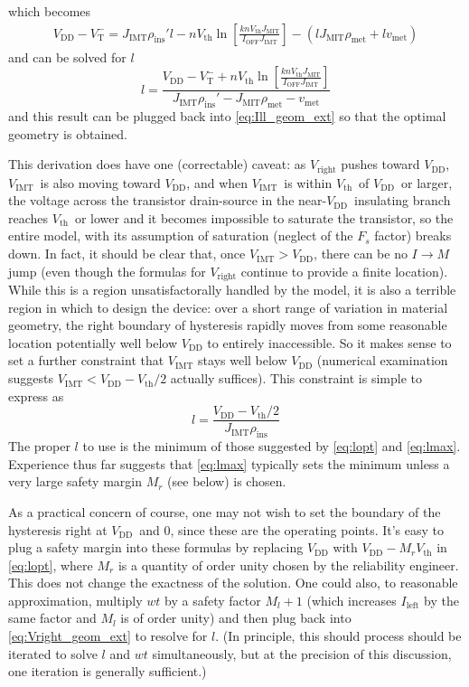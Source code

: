 \documentclass[letterpaper]{article}
\newcommand{\VTm}{\ensuremath{V_\mathrm{T}^-}}
\newcommand{\VDD}{\ensuremath{V_\mathrm{DD}}}
\newcommand{\Vth}{\ensuremath{V_\mathrm{th}}}
\newcommand{\VIMT}{\ensuremath{V_\mathrm{IMT}}}
\newcommand{\vmet}{\ensuremath{v_\mathrm{met}}}
\newcommand{\IOFF }{\ensuremath{I_\mathrm{OFF}}}
\newcommand{\pins}{\ensuremath{\rho_\mathrm{ins}}}
\newcommand{\pmet}{\ensuremath{\rho_\mathrm{met}}}
\newcommand{\pinsp}{\ensuremath{\rho_\mathrm{ins}'}}
\begin{document}
which becomes
\begin{multline*}
  V_\mathrm{DD}-\VTm=J_\mathrm{IMT}\pinsp l-n\Vth \ln\left[ \frac{kn\Vth J_\mathrm{MIT}}{ \IOFF J_\mathrm{IMT}} \right]
  -\left( lJ_\mathrm{MIT}\pmet+l\vmet \right)
\end{multline*}
and can be solved for $l$
\begin{equation}
  l=\frac{V_\mathrm{DD}-\VTm+n\Vth \ln\left[ \frac{kn\Vth J_\mathrm{MIT}}{ \IOFF J_\mathrm{IMT}} \right]}{J_\mathrm{IMT}\pinsp - J_\mathrm{MIT}\pmet-\vmet}
  \label{eq:lopt}
\end{equation}
and this result can be plugged back into \eqref{eq:Ill_geom_ext} so that the optimal geometry is obtained.

This derivation does have one (correctable) caveat: as $V_\mathrm{right}$ pushes toward \VDD, \VIMT\ is also moving toward \VDD, and when \VIMT\ is within \Vth\ of \VDD\ or larger, the voltage across the transistor drain-source in the near-\VDD\ insulating branch reaches \Vth\ or lower and it becomes impossible to saturate the transistor, so the entire model, with its assumption of saturation (neglect of the $F_s$ factor) breaks down.  In fact, it should be clear that, once $\VIMT>\VDD$, there can be no $I\rightarrow M$ jump (even though the formulas for $V_\mathrm{right}$ continue to provide a finite location).  While this is a region unsatisfactorally handled by the model, it is also a terrible region in which to design the device: over a short range of variation in material geometry, the right boundary of hysteresis rapidly moves from some reasonable location potentially well below $\VDD$ to entirely inaccessible.  So it makes sense to set a further constraint that $\VIMT$ stays well below $\VDD$ (numerical examination suggests $\VIMT < \VDD - \Vth/2$ actually suffices).  This constraint is simple to express as
\begin{equation}
  l=\frac{\VDD-\Vth/2}{J_\mathrm{IMT}\pins}
  \label{eq:lmax}
\end{equation}
The proper $l$ to use is the minimum of those suggested by \eqref{eq:lopt} and \eqref{eq:lmax}.  Experience thus far suggests that \eqref{eq:lmax} typically sets the minimum unless a very large safety margin $M_r$ (see below) is chosen.

As a practical concern of course, one may not wish to set the boundary of the hysteresis right at \VDD\ and 0, since these are the operating points.  It's easy to plug a safety margin into these formulas by replacing $\VDD$ with $\VDD-M_r\Vth$ in \eqref{eq:lopt}, where $M_r$ is a quantity of order unity chosen by the reliability engineer.  This does not change the exactness of the solution.  One could also, to reasonable approximation, multiply $wt$ by a safety factor $M_l+1$ (which increases $I_\mathrm{left}$ by the same factor and $M_l$ is of order unity) and then plug back into \eqref{eq:Vright_geom_ext} to resolve for $l$.  (In principle, this should process should be iterated to solve $l$ and $wt$ simultaneously, but at the precision of this discussion, one iteration is generally sufficient.)
\end{document}
